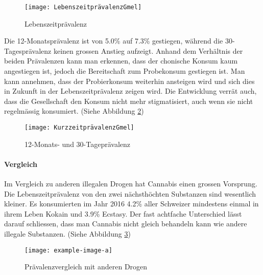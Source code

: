 \documentclass[../main.tex]{subfiles}
\begin{document}
	\noindent	 
	\begin{figure}[H]
		\centering
		\texttt{[image: LebenszeitprävalenzGmel]}
		\captionsetup{font=small}
		\caption[Lebenszeitprävalenz]{Lebenszeitprävalenz\protect\footnotemark}
		\label{fig:langzeitpravalenz}		
	\end{figure}
	
	\noindent
	Die 12-Monatsprävalenz ist von 5.0\% auf 7.3\% gestiegen, während die 30-Tagesprävalenz keinen grossen Anstieg aufzeigt. 
	Anhand dem Verhältnis der beiden Prävalenzen kann man erkennen, dass der chonische Konsum kaum angestiegen ist, jedoch die Bereitschaft zum Probekonsum gestiegen ist. 
	Man kann annehmen, dass der Probierkonsum weiterhin ansteigen wird und sich dies in Zukunft in der Lebenszeitprävalenz zeigen wird.
	Die Entwicklung verrät auch, dass die Gesellschaft den Konsum nicht mehr stigmatisiert, auch wenn sie nicht regelmässig konsumiert.
	(Siehe Abbildung \ref{fig:kurzzeitpravalenz})
	
	\noindent	 
	\begin{figure}[H]
		\centering
		\texttt{[image: KurzzeitprävalenzGmel]}
		\captionsetup{font=small}
		\caption[12-Monats- und 30-Tageprävalenz]{12-Monats- und 30-Tageprävalenz\protect\footnotemark}	
		\label{fig:kurzzeitpravalenz}	
	\end{figure}
	
	\paragraph{Vergleich}
	Im Vergleich zu anderen illegalen Drogen hat Cannabis einen grossen Vorsprung.
	Die Lebenszeitprävalenz von den zwei nächsthöchten Substanzen sind wesentlich kleiner.
	Es konsumierten im Jahr 2016 4.2\% aller Schweizer mindestens einmal in ihrem Leben Kokain und 3.9\% Ecstasy.
	Der fast achtfache Unterschied lässt darauf schliessen, dass man Cannabis nicht gleich behandeln kann wie andere illegale Substanzen. 
	(Siehe Abbildung \ref{fig:otherdrugs})
	
	\noindent
	\begin{figure}[H]
		\centering
		\texttt{[image: example-image-a]}
		\captionsetup{font=small}
		\caption[Prävalenzvergleich mit anderen Drogen]{Prävalenzvergleich mit anderen Drogen\protect\footnotemark}		
		\label{fig:otherdrugs}
	\end{figure}
	
\end{document}
